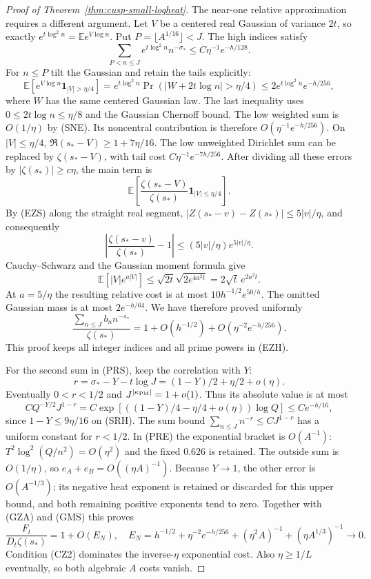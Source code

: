 \documentclass[11pt]{article}
\theoremstyle{remark}\newtheorem{remark}[theorem]{Remark}
\begin{document}
\begin{proof}[Proof of Theorem~\ref{thm:cusp-small-logheat}]
The near-one relative approximation requires a different argument.
Let $V$ be a centered real Gaussian of variance $2t$, so exactly
$e^{t\log^2n}=\mathbb E e^{V\log n}$.
Put $P=\lfloor A^{1/16}\rfloor<J$. The high indices satisfy
\[
 \sum_{P<n\le J}e^{t\log^2n}n^{-\sigma_*}
       \le C\eta^{-1}e^{-h/128}.                       \tag{GH}
\]
For $n\le P$ tilt the Gaussian and retain the tails explicitly:
\[
 \mathbb E[e^{V\log n}\mathbf1_{|V|>\eta/4}]
 =e^{t\log^2n}\Pr(|W+2t\log n|>\eta/4)
\le2e^{t\log^2n}e^{-h/256},                           \tag{GWT}
\]
where $W$ has the same centered Gaussian law. The last inequality
uses $0\le2t\log n\le\eta/8$ and the Gaussian Chernoff bound.
The low weighted sum is $O(1/\eta)$ by (SNE).
Its noncentral contribution is therefore
$O(\eta^{-1}e^{-h/256})$.
On $|V|\le\eta/4$, $\Re(s_*-V)\ge1+7\eta/16$.
The low unweighted Dirichlet sum can be replaced by $\zeta(s_*-V)$,
with tail cost $C\eta^{-1}e^{-7h/256}$.
After dividing all these errors by $|\zeta(s_*)|\ge c\eta$,
the main term is
\[
 \mathbb E\left[
  \frac{\zeta(s_*-V)}{\zeta(s_*)}\mathbf1_{|V|\le\eta/4}\right].
\]
By (EZS) along the straight real segment,
$|Z(s_*-v)-Z(s_*)|\le5|v|/\eta$, and consequently
\[
 \left|\frac{\zeta(s_*-v)}{\zeta(s_*)}-1\right|
       \le(5|v|/\eta)e^{5|v|/\eta}.
\]
Cauchy--Schwarz and the Gaussian moment formula give
\[
 \mathbb E[|V|e^{a|V|}]
       \le\sqrt{2t}\sqrt{2e^{4a^2t}}=2\sqrt t\,e^{2a^2t}.
\]
At $a=5/\eta$ the resulting relative cost is at most
$10h^{-1/2}e^{50/h}$. The omitted Gaussian mass is at most
$2e^{-h/64}$. We have therefore proved uniformly
\[
 \frac{\sum_{n\le J}b_n n^{-s_*}}{\zeta(s_*)}
     =1+O(h^{-1/2})+O(\eta^{-2}e^{-h/256}).             \tag{GZA}
\]
This proof keeps all integer indices and all prime powers in (EZH).

For the second sum in (PRS), keep the correlation with $Y$:
\[
 r=\sigma_*-Y-t\log J=(1-Y)/2+\eta/2+o(\eta).
\]
Eventually $0<r<1/2$ and $J^{|\kappa_{\rm PM}|}=1+o(1)$.
Thus its absolute value is at most
\[
 C Q^{-Y/2}J^{1-r}
 =C\exp[((1-Y)/4-\eta/4+o(\eta))\log Q]
       \le Ce^{-h/16},                                \tag{GMS}
\]
since $1-Y\le9\eta/16$ on (SRH).
The sum bound $\sum_{n\le J}n^{-r}\le CJ^{1-r}$ has a uniform
constant for $r<1/2$.
In (PRE) the exponential bracket is $O(A^{-1})$:
$T^2\log^2(Q/n^2)=O(\eta^2)$ and the fixed $0.626$ is retained.
The outside sum is $O(1/\eta)$, so
$e_A+e_B=O((\eta A)^{-1})$.
Because $Y\to1$, the other error is $O(A^{-1/3})$; its
negative heat exponent is retained or discarded for this upper bound,
and both remaining positive exponents tend to zero.
Together with (GZA) and (GMS) this proves
\[
 \frac{F_t}{D_t\zeta(s_*)}=1+O(E_N),\quad
 E_N=h^{-1/2}+\eta^{-2}e^{-h/256}
            +(\eta^2 A)^{-1}+(\eta A^{1/3})^{-1}\to0. \tag{GER}
\]
Condition (CZ2) dominates the inverse-$\eta$ exponential cost.
Also $\eta\ge1/L$ eventually, so both algebraic $A$ costs vanish.


\end{proof}
\end{document}
